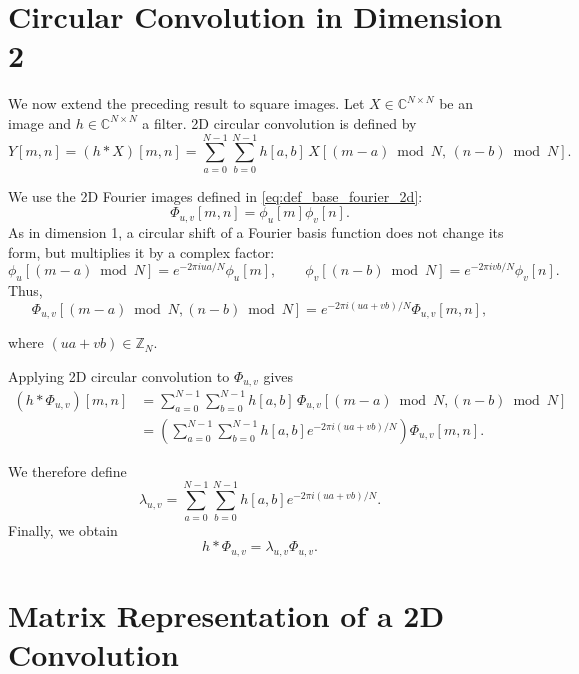 \section{Circular Convolution in Dimension 2}
\label{sec:convolution-circulaire-2d}

We now extend the preceding result to square images. Let
$X\in\mathbb{C}^{N\times N}$ be an image and
$h\in\mathbb{C}^{N\times N}$ a filter. 2D circular convolution is defined by
\begin{equation}
    Y[m,n]
    =
    (h * X)[m,n]
    =
    \sum_{a=0}^{N-1}
    \sum_{b=0}^{N-1}
    h[a,b]\,
    X[(m-a)\bmod N,\,(n-b)\bmod N].
    \label{eq:def_convolution_circulaire_2d}
\end{equation}

We use the 2D Fourier images defined in \eqref{eq:def_base_fourier_2d}:
\[
    \Phi_{u,v}[m,n]
    =
    \phi_u[m]\phi_v[n].
\]
As in dimension 1, a circular shift of a Fourier basis function does not change its form, but
multiplies it by a complex factor:
\[
    \phi_u[(m-a)\bmod N]
    =
    e^{-2\pi iua/N}\phi_u[m],
    \qquad
    \phi_v[(n-b)\bmod N]
    =
    e^{-2\pi ivb/N}\phi_v[n].
\]
Thus,
\[
    \Phi_{u,v}[(m-a)\bmod N,(n-b)\bmod N]
    =
    e^{-2\pi i(ua+vb)/N}
    \Phi_{u,v}[m,n],
\]

where $(ua + vb) \in \mathbb{Z}_N$.

Applying 2D circular convolution to $\Phi_{u,v}$ gives
\begin{align}
(h * \Phi_{u,v})[m,n]
&=
\sum_{a=0}^{N-1}
\sum_{b=0}^{N-1}
h[a,b]\,
\Phi_{u,v}[(m-a)\bmod N,(n-b)\bmod N]
\nonumber \\
&=
\left(
\sum_{a=0}^{N-1}
\sum_{b=0}^{N-1}
h[a,b]e^{-2\pi i(ua+vb)/N}
\right)
\Phi_{u,v}[m,n].
\end{align}

We therefore define
\begin{equation}
    \lambda_{u,v}
    =
    \sum_{a=0}^{N-1}
    \sum_{b=0}^{N-1}
    h[a,b]e^{-2\pi i(ua+vb)/N}.
    \label{eq:valeur_propre_convolution_2d}
\end{equation}
Finally, we obtain
\begin{equation}
    h * \Phi_{u,v}
    =
    \lambda_{u,v}\Phi_{u,v}.
    \label{eq:fourier_fonction_propre_conv_2d}
\end{equation}

\section{Matrix Representation of a 2D Convolution}

